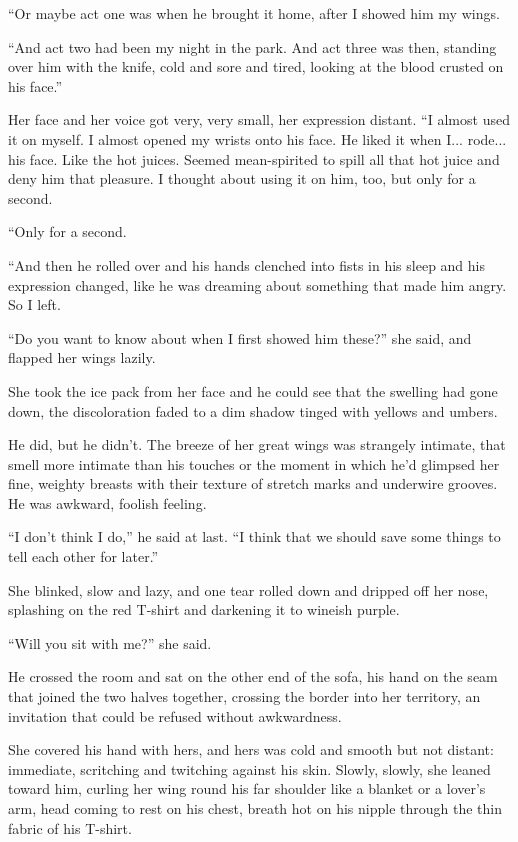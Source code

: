 \documentclass{article}
\begin{document}
``Or maybe act one was when he brought it home, after I showed him my
wings.

``And act two had been my night in the park.  And act three was then,
standing over him with the knife, cold and sore and tired, looking at
the blood crusted on his face.''

Her face and her voice got very, very small, her expression distant. 
``I almost used it on myself.  I almost opened my wrists onto his
face.  He liked it when I...  rode...  his face.  Like the hot juices. 
Seemed mean-spirited to spill all that hot juice and deny him that
pleasure.  I thought about using it on him, too, but only for a
second.

``Only for a second.

``And then he rolled over and his hands clenched into fists in his
sleep and his expression changed, like he was dreaming about something
that made him angry.  So I left.

``Do you want to know about when I first showed him these?'' she said,
and flapped her wings lazily.

She took the ice pack from her face and he could see that the swelling
had gone down, the discoloration faded to a dim shadow tinged with
yellows and umbers.

He did, but he didn't.  The breeze of her great wings was strangely
intimate, that smell more intimate than his touches or the moment in
which he'd glimpsed her fine, weighty breasts with their texture of
stretch marks and underwire grooves.  He was awkward, foolish feeling.

``I don't think I do,'' he said at last.  ``I think that we should
save some things to tell each other for later.''

She blinked, slow and lazy, and one tear rolled down and dripped off
her nose, splashing on the red T-shirt and darkening it to wineish
purple.

``Will you sit with me?'' she said.

He crossed the room and sat on the other end of the sofa, his hand on
the seam that joined the two halves together, crossing the border into
her territory, an invitation that could be refused without
awkwardness.

She covered his hand with hers, and hers was cold and smooth but not
distant:  immediate, scritching and twitching against his skin. 
Slowly, slowly, she leaned toward him, curling her wing round his far
shoulder like a blanket or a lover's arm, head coming to rest on his
chest, breath hot on his nipple through the thin fabric of his
T-shirt.
\end{document}
